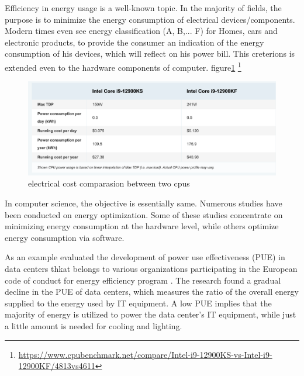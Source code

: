 


Efficiency in energy usage is a well-known topic. In the majority of fields, the purpose is to minimize the energy consumption of electrical devices/components. Modern times even see energy classification (A, B,... F) for Homes, cars and electronic products, to provide the consumer an indication of the energy consumption of his devices, which will reflect on his power bill. This creterions is extended even to the hardware components of computer.
figure\ref{fig:soa_comparaisoncpu} \footnote{\url{https://www.cpubenchmark.net/compare/Intel-i9-12900KS-vs-Intel-i9-12900KF/4813vs4611}}


\begin{figure}
    \includegraphics[width=\linewidth]{imgs/cpu_cost_comparaison}
    \caption{electrical cost comparasion between two cpus }
    \label{fig:soa_comparaisoncpu}
\end{figure}

In computer science, the objective is essentially same.
Numerous studies have been conducted on energy optimization.
Some of these studies concentrate on minimizing energy consumption at the hardware level, while others optimize energy consumption via software.

As an example \citeauthor{avgerinou2017trends} evaluated the development of power use effectiveness (PUE) in data centers thkat belongs to various organizations participating in the European code of conduct for energy efficiency program \cite{avgerinou2017trends}.
The research found a gradual decline in the PUE of data centers, which measures the ratio of the overall energy supplied to the energy used by IT equipment.
A low PUE implies that the majority of energy is utilized to power the data center's IT equipment, while just a little amount is needed for cooling and lighting.


